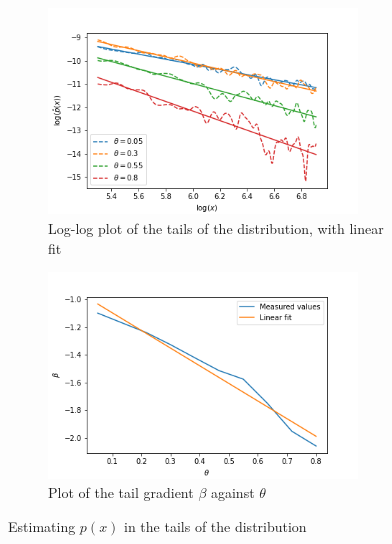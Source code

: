 \documentclass[a4paper]{article}
\begin{document}
\begin{figure}[H]
    \centering
    \begin{subfigure}[b]{0.45\textwidth}
        \includegraphics[width=0.9\textwidth]{figures/gamma_sampled_gaussian_tail_fit.png}
        \caption{Log-log plot of the tails of the distribution, with linear fit}
        \label{fig:gamma_sampled_gaussian_tail_fit}
    \end{subfigure}
    \hfill
    \begin{subfigure}[b]{0.45\textwidth}
        \includegraphics[width=0.9\textwidth]{figures/beta_vs_theta.png}
        \caption{Plot of the tail gradient $\beta$ against $\theta$}
        \label{fig:beta_vs_theta}
    \end{subfigure}
    \caption{Estimating $p(x)$ in the tails of the distribution}
    \label{fig:tail_estimate}
\end{figure}
\end{document}
